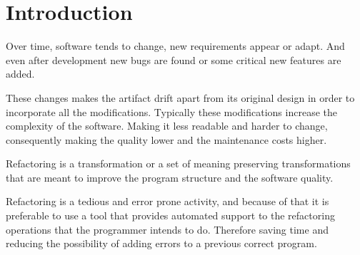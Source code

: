 
% 
% 

\section{Introduction}


Over time, software tends to change, new requirements appear or adapt. 
And even after development new bugs are found or some critical new features are added.

These changes makes the artifact drift apart from its original design in order to incorporate all the modifications.
Typically these modifications increase the complexity of the software. 
Making it less readable and harder to change, consequently making the quality lower and the maintenance costs higher. %

Refactoring is a transformation or a set of meaning preserving transformations that are meant to improve the program structure and the software quality.\cite{bourquin2007high}



Refactoring is a tedious and error prone activity, and because of that it is preferable to use a tool that provides automated support to the refactoring operations that the programmer intends to do. 
Therefore saving time and reducing the possibility of adding errors to a previous correct program.

